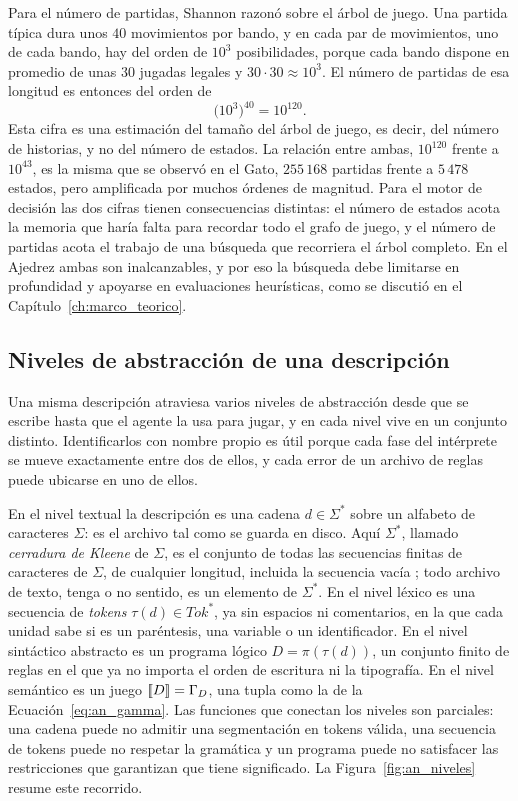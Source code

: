 Para el número de partidas, Shannon razonó sobre el árbol de juego. Una partida típica dura unos $40$ movimientos por bando, y en cada par de movimientos, uno de cada bando, hay del orden de $10^3$ posibilidades, porque cada bando dispone en promedio de unas $30$ jugadas legales y $30 \cdot 30 \approx 10^3$. El número de partidas de esa longitud es entonces del orden de
\begin{equation}
    \big(10^3\big)^{40} = 10^{120}.
    \label{eq:an_shannon_partidas}
\end{equation}
Esta cifra es una estimación del tamaño del árbol de juego, es decir, del número de historias, y no del número de estados. La relación entre ambas, $10^{120}$ frente a $10^{43}$, es la misma que se observó en el Gato, $255\,168$ partidas frente a $5\,478$ estados, pero amplificada por muchos órdenes de magnitud. Para el motor de decisión las dos cifras tienen consecuencias distintas: el número de estados acota la memoria que haría falta para recordar todo el grafo de juego, y el número de partidas acota el trabajo de una búsqueda que recorriera el árbol completo. En el Ajedrez ambas son inalcanzables, y por eso la búsqueda debe limitarse en profundidad y apoyarse en evaluaciones heurísticas, como se discutió en el Capítulo~\ref{ch:marco_teorico}.

\subsection{Niveles de abstracción de una descripción}

Una misma descripción atraviesa varios niveles de abstracción desde que se escribe hasta que el agente la usa para jugar, y en cada nivel vive en un conjunto distinto. Identificarlos con nombre propio es útil porque cada fase del intérprete se mueve exactamente entre dos de ellos, y cada error de un archivo de reglas puede ubicarse en uno de ellos.

En el nivel textual la descripción es una cadena $d \in \Sigma^*$ sobre un alfabeto de caracteres $\Sigma$: es el archivo tal como se guarda en disco. Aquí $\Sigma^*$, llamado \emph{cerradura de Kleene} de $\Sigma$, es el conjunto de todas las secuencias finitas de caracteres de $\Sigma$, de cualquier longitud, incluida la secuencia vacía \cite{HopcroftMotwaniUllman2006}; todo archivo de texto, tenga o no sentido, es un elemento de $\Sigma^*$. En el nivel léxico es una secuencia de \emph{tokens} $\tau(d) \in \mathit{Tok}^*$, ya sin espacios ni comentarios, en la que cada unidad sabe si es un paréntesis, una variable o un identificador. En el nivel sintáctico abstracto es un programa lógico $D = \pi(\tau(d))$, un conjunto finito de reglas en el que ya no importa el orden de escritura ni la tipografía. En el nivel semántico es un juego $[\![D]\!] = \Gamma_D$, una tupla como la de la Ecuación~\eqref{eq:an_gamma}. Las funciones que conectan los niveles son parciales: una cadena puede no admitir una segmentación en tokens válida, una secuencia de tokens puede no respetar la gramática y un programa puede no satisfacer las restricciones que garantizan que tiene significado. La Figura~\ref{fig:an_niveles} resume este recorrido.

